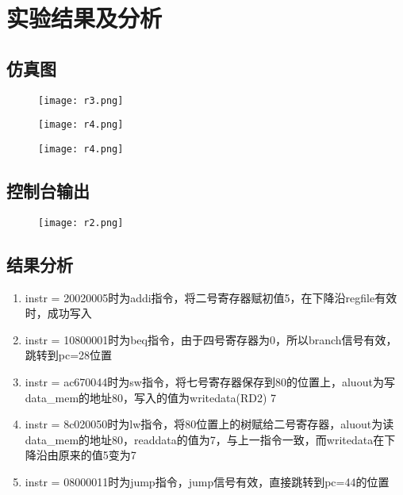 \section{实验结果及分析}

\newpage
\subsection{仿真图}
\begin{figure}[htbp]
    \centering
    \texttt{[image: r3.png]}
    \label{图5}
\end{figure}
\begin{figure}[htbp]
    \centering
    \texttt{[image: r4.png]}
    \label{图6}
\end{figure}
\begin{figure}[htbp]
    \centering
    \texttt{[image: r4.png]}
    \label{图7}
\end{figure}


\subsection{控制台输出}
\begin{figure}[htbp]
    \centering
    \texttt{[image: r2.png]}
    \label{图8}
\end{figure}
\newpage
\subsection{结果分析}
\begin{enumerate}
    \item instr = 20020005时为addi指令，将二号寄存器赋初值5，在下降沿regfile有效时，成功写入
    \item instr = 10800001时为beq指令，由于四号寄存器为0，所以branch信号有效，跳转到pc=28位置
    \item instr = ac670044时为sw指令，将七号寄存器保存到80的位置上，aluout为写data\_mem的地址80，写入的值为writedata(RD2) 7
    \item instr = 8c020050时为lw指令，将80位置上的树赋给二号寄存器，aluout为读data\_mem的地址80，readdata的值为7，与上一指令一致，而writedata在下降沿由原来的值5变为7
    \item instr = 08000011时为jump指令，jump信号有效，直接跳转到pc=44的位置
\end{enumerate}